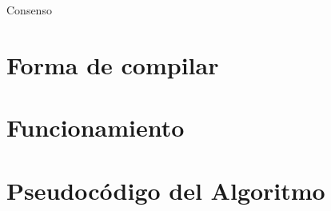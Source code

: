 \documentclass[a4paper,12pt]{article}
\begin{document}

\newpage



\newpage

\begin{center}
    {\huge Consenso}
\end{center}

\section*{Forma de compilar}

\section*{Funcionamiento}

\section*{Pseudocódigo del Algoritmo}
\end{document}
